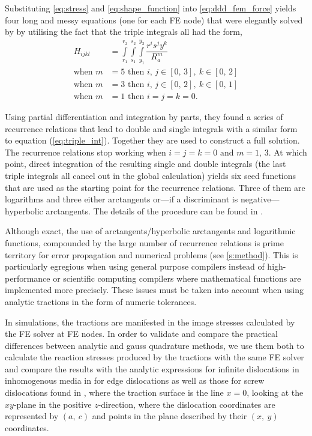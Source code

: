 \documentclass[11pt]{iopart}
\begin{document}
Substituting \cref{eq:stress} and \cref{eq:shape_function} into \cref{eq:ddd_fem_force} yields four long and messy equations (one for each FE node) that were elegantly solved by \citet{Queyreau} by utilising the fact that the triple integrals all had the form,
\begin{align}
    H_{ijkl}        & = \int\limits_{r_{1}}^{r_{2}}\int\limits_{s_{1}}^{s_{2}}\int\limits_{y_{1}}^{y_{2}} \dfrac{r^i s^j y^k}{R_{a}^{m}}\label{eq:triple_int} \\
    \textrm{when }m & = 5 \textrm{ then } i,\, j \in [0,\,3],~k \in [0,\,2]\nonumber                                                                          \\
    \textrm{when }m & = 3 \textrm{ then } i,\, j \in [0,\,2],~k \in [0,\,1]\nonumber                                                                          \\
    \textrm{when }m & = 1 \textrm{ then } i = j = k = 0\nonumber.
\end{align}

Using partial differentiation and integration by parts, they found a series of recurrence relations that lead to double and single integrals with a similar form to equation (\cref{eq:triple_int}). Together they are used to construct a full solution. The recurrence relations stop working when $i = j = k = 0 \textrm{ and } m = 1,\, 3$. At which point, direct integration of the resulting single and double integrals (the last triple integrals all cancel out in the global calculation) yields six seed functions that are used as the starting point for the recurrence relations. Three of them are logarithms and three either arctangents or---if a discriminant is negative---hyperbolic arctangents. The details of the procedure can be found in \cite{Queyreau}.

Although exact, the use of arctangents/hyperbolic arctangents and logarithmic functions, compounded by the large number of recurrence relations is prime territory for error propagation and numerical problems (see \cref{s:method}). This is particularly egregious when using general purpose compilers instead of high-performance or scientific computing compilers where mathematical functions are implemented more precisely. These issues must be taken into account when using analytic tractions in the form of numeric tolerances.

In simulations, the tractions are manifested in the image stresses calculated by the FE solver at FE nodes. In order to validate and compare the practical differences between analytic and gauss quadrature methods, we use them both to calculate the reaction stresses produced by the tractions with the same FE solver and compare the results with the analytic expressions for infinite dislocations in inhomogenous media in \cite{head1953edge} for edge dislocations as well as those for screw dislocations found in \cite[p.~59,~64]{hirth1983theory}, where the traction surface is the line $x=0$, looking at the $xy$-plane in the positive $z$-direction, where the dislocation coordinates are represented by $(a,~c)$ and points in the plane described by their $(x,~y)$ coordinates.
\end{document}
